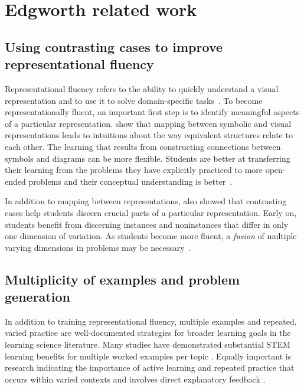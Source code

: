 

\section{Edgworth related work}
\label{sec:edgeworth-related}

\subsection{Using contrasting cases to improve representational fluency}

Representational fluency refers to the ability to quickly understand a visual representation and to use it to solve domain-specific tasks~\cite{multipleReps}. To become representationally fluent, an important first step is to identify meaningful aspects of a particular representation. \citet{perceptualLearning} show that mapping between symbolic and visual representations leads to intuitions about the way equivalent structures relate to each other. The learning that results from constructing connections between symbols and diagrams can be more flexible. Students are better at transferring their learning from the problems they have explicitly practiced to more open-ended problems and their conceptual understanding is better~\cite{25learning}. 

In addition to mapping between representations, \citet{samenessAndDifference} also showed that contrasting cases help students discern crucial parts of a particular representation. Early on, students benefit from discerning instances and noninstances that differ in only one dimension of variation. As students become more fluent, a \emph{fusion} of multiple varying dimensions in problems may be necessary~\cite{fusion}.

\subsection{Multiplicity of examples and problem generation}

In addition to training representational fluency, multiple examples and repeated, varied practice are well-documented strategies for broader learning goals in the learning science literature. Many studies have demonstrated substantial STEM learning benefits for multiple worked examples per topic \cite{PBB07}. Equally important is research indicating the importance of active learning \cite{CW14, DMM19} and repeated practice \cite{deliberatePractice, SSL98} that occurs within varied contexts \cite{PV94, RT07} and involves direct explanatory feedback \cite{perceptualLearning}.

